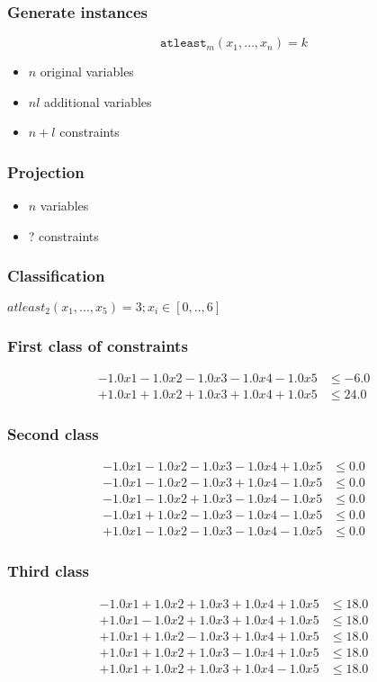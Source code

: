 \documentclass{beamer}
\begin{document}
\begin{frame}
  
  \frametitle{Generate instances}
  \begin{displaymath}
    \mathtt{atleast}_m(x_1, \ldots, x_n)=k 
  \end{displaymath}
  \begin{itemize}
  \item $n$ original variables
  \item $nl$ additional variables
  \item $n+l$ constraints
  \end{itemize}
\end{frame}

\begin{frame}
  \frametitle{Projection}
  \begin{itemize}
  \item $n$ variables
  \item ? constraints
  \end{itemize}
\end{frame}

\begin{frame}
  \frametitle{Classification}
  $atleast_2(x_1,...,x_5) = 3  ; x_i \in [0,..,6]$
\end{frame}

\begin{frame}
  \frametitle{First class of constraints}
  \begin{align*}
    -1.0 x1   -1.0 x2   -1.0 x3   -1.0 x4   -1.0 x5   &\le -6.0 \\
    +1.0 x1   +1.0 x2   +1.0 x3   +1.0 x4   +1.0 x5   &\le 24.0 
  \end{align*}
\end{frame}

\begin{frame}
  \frametitle{Second class}
  \begin{align*}
    -1.0 x1   -1.0 x2   -1.0 x3   -1.0 x4   +1.0 x5   &\le 0.0 \\
    -1.0 x1   -1.0 x2   -1.0 x3   +1.0 x4   -1.0 x5   &\le 0.0 \\
    -1.0 x1   -1.0 x2   +1.0 x3   -1.0 x4   -1.0 x5   &\le 0.0\\
    -1.0 x1   +1.0 x2   -1.0 x3   -1.0 x4   -1.0 x5   &\le 0.0\\
    +1.0 x1   -1.0 x2   -1.0 x3   -1.0 x4   -1.0 x5   &\le 0.0
  \end{align*}
\end{frame}

\begin{frame}
  \frametitle{Third class}
  \begin{align*}
-1.0 x1   +1.0 x2   +1.0 x3   +1.0 x4   +1.0 x5   &\le 18.0 \\
+1.0 x1   -1.0 x2   +1.0 x3   +1.0 x4   +1.0 x5   &\le 18.0 \\
+1.0 x1   +1.0 x2   -1.0 x3   +1.0 x4   +1.0 x5   &\le 18.0 \\
+1.0 x1   +1.0 x2   +1.0 x3   -1.0 x4   +1.0 x5   &\le 18.0 \\
+1.0 x1   +1.0 x2   +1.0 x3   +1.0 x4   -1.0 x5   &\le 18.0 
  \end{align*}
\end{frame}
\end{document}
